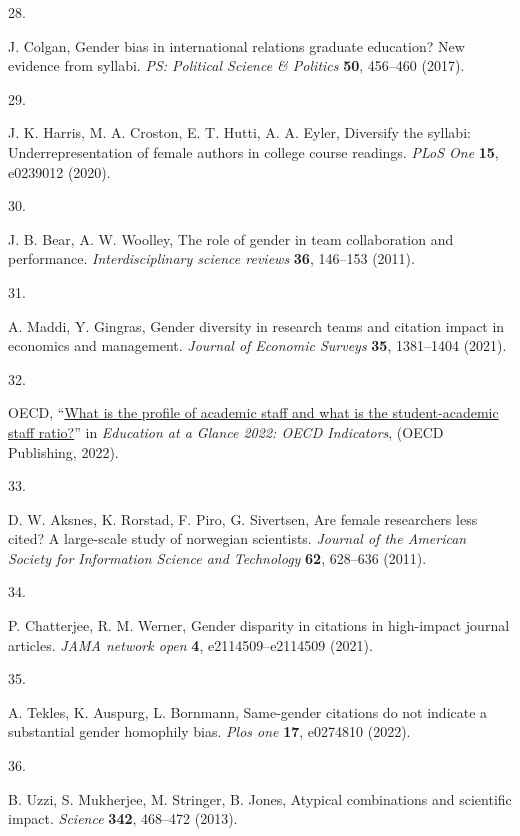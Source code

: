 \documentclass[
  12pt,
]{article}
\newlength{\cslhangindent}
\newlength{\csllabelwidth}
\newenvironment{CSLReferences}[2] %
 {\begin{list}{}{%
  \setlength{\itemindent}{0pt}
  \setlength{\leftmargin}{0pt}
  \setlength{\parsep}{0pt}
  \ifodd #1
   \setlength{\leftmargin}{\cslhangindent}
   \setlength{\itemindent}{-1\cslhangindent}
  \fi
  \setlength{\itemsep}{#2\baselineskip}}}
 {\end{list}}
\newcommand{\CSLLeftMargin}[1]{\parbox[t]{\csllabelwidth}{\strut#1\strut}}
\newcommand{\CSLRightInline}[1]{\parbox[t]{\linewidth - \csllabelwidth}{\strut#1\strut}}
\begin{document}
\begin{CSLReferences}{0}{1}
\CSLLeftMargin{28. }%
\CSLRightInline{J. Colgan, Gender bias in international relations graduate education? New evidence from syllabi. \emph{PS: Political Science \& Politics} \textbf{50}, 456--460 (2017).}

\CSLLeftMargin{29. }%
\CSLRightInline{J. K. Harris, M. A. Croston, E. T. Hutti, A. A. Eyler, Diversify the syllabi: Underrepresentation of female authors in college course readings. \emph{PLoS One} \textbf{15}, e0239012 (2020).}

\CSLLeftMargin{30. }%
\CSLRightInline{J. B. Bear, A. W. Woolley, The role of gender in team collaboration and performance. \emph{Interdisciplinary science reviews} \textbf{36}, 146--153 (2011).}

\CSLLeftMargin{31. }%
\CSLRightInline{A. Maddi, Y. Gingras, Gender diversity in research teams and citation impact in economics and management. \emph{Journal of Economic Surveys} \textbf{35}, 1381--1404 (2021).}

\CSLLeftMargin{32. }%
\CSLRightInline{OECD, {``\href{https://doi.org/10.1787/bb6ee273-en}{What is the profile of academic staff and what is the student-academic staff ratio?}''} in \emph{Education at a Glance 2022: OECD Indicators}, (OECD Publishing, 2022).}

\CSLLeftMargin{33. }%
\CSLRightInline{D. W. Aksnes, K. Rorstad, F. Piro, G. Sivertsen, Are female researchers less cited? A large-scale study of norwegian scientists. \emph{Journal of the American Society for Information Science and Technology} \textbf{62}, 628--636 (2011).}

\CSLLeftMargin{34. }%
\CSLRightInline{P. Chatterjee, R. M. Werner, Gender disparity in citations in high-impact journal articles. \emph{JAMA network open} \textbf{4}, e2114509--e2114509 (2021).}

\CSLLeftMargin{35. }%
\CSLRightInline{A. Tekles, K. Auspurg, L. Bornmann, Same-gender citations do not indicate a substantial gender homophily bias. \emph{Plos one} \textbf{17}, e0274810 (2022).}

\CSLLeftMargin{36. }%
\CSLRightInline{B. Uzzi, S. Mukherjee, M. Stringer, B. Jones, Atypical combinations and scientific impact. \emph{Science} \textbf{342}, 468--472 (2013).}


\end{CSLReferences}
\end{document}
